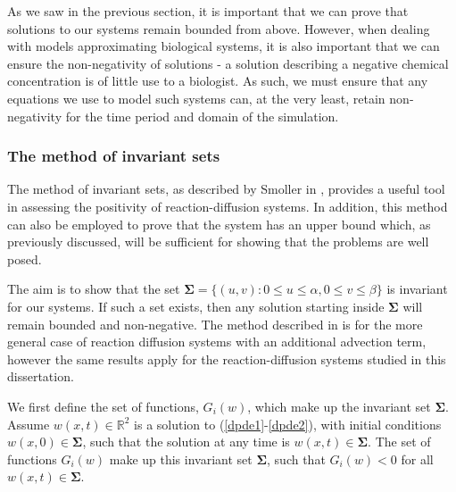 \documentclass[12pt]{article}
\begin{document}
As we saw in the previous section, it is important that we can prove that solutions to our systems remain bounded from above. However, when dealing with models approximating biological systems, it is also important that we can ensure the non-negativity of solutions - a solution describing a negative chemical concentration is of little use to a biologist. As such, we must ensure that any equations we use to model such systems can, at the very least, retain non-negativity for the time period and domain of the simulation. 
\newpage
\subsubsection{The method of invariant sets}
The method of invariant sets, as described by Smoller in \cite{Smoller}, provides a useful tool in assessing the positivity of reaction-diffusion systems. In addition, this method can also be employed to prove that the system has an upper bound which, as previously discussed, will be sufficient for showing that the problems are well posed.

The aim is to show that the set $\mathbf{\Sigma} = \lbrace (u,v): 0\leq u\leq\alpha, 0\leq v\leq\beta \rbrace$ is invariant for our systems. If such a set exists, then any solution starting inside $\mathbf{\Sigma}$ will remain bounded and non-negative. The method described in \cite{Smoller} is for the more general case of reaction diffusion systems with an additional advection term, however the same results apply for the reaction-diffusion systems studied in this dissertation. 

We first define the set of functions, $G_i(w)$, which make up the invariant set $\mathbf{\Sigma}$. Assume $w(x,t) \in \mathbb{R}^2$ is a solution to (\ref{dpde1}-\ref{dpde2}), with initial conditions $w(x,0) \in \mathbf{\Sigma}$, such that the solution at any time is $w(x,t)\in \mathbf{\Sigma}$. The set of functions $G_i(w)$ make up this invariant set $\mathbf{\Sigma}$, such that $G_i(w) < 0$ for all $w(x,t) \in \mathbf{\Sigma}$. 
\end{document}
